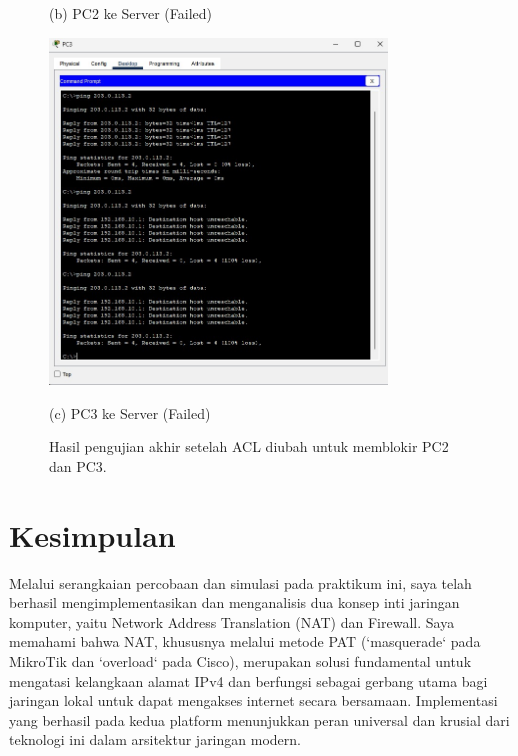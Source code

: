 \begin{enumerate}
\begin{figure}[H]
\begin{minipage}{0.48\textwidth}
            \caption*{(b) PC2 ke Server (Failed)}
        \end{minipage}
        \vspace{1em}
        \begin{minipage}{0.48\textwidth}
            \centering
            \includegraphics[width=0.8\textwidth]{img4/PC3ping2.jpeg}
            \caption*{(c) PC3 ke Server (Failed)}
        \end{minipage}
        \caption{Hasil pengujian akhir setelah ACL diubah untuk memblokir PC2 dan PC3.}
    \end{figure}
\end{enumerate}

\newpage
\section{Kesimpulan}

Melalui serangkaian percobaan dan simulasi pada praktikum ini, saya telah berhasil mengimplementasikan dan menganalisis dua konsep inti jaringan komputer, yaitu Network Address Translation (NAT) dan Firewall. Saya memahami bahwa NAT, khususnya melalui metode PAT (`masquerade` pada MikroTik dan `overload` pada Cisco), merupakan solusi fundamental untuk mengatasi kelangkaan alamat IPv4 dan berfungsi sebagai gerbang utama bagi jaringan lokal untuk dapat mengakses internet secara bersamaan. Implementasi yang berhasil pada kedua platform menunjukkan peran universal dan krusial dari teknologi ini dalam arsitektur jaringan modern.

